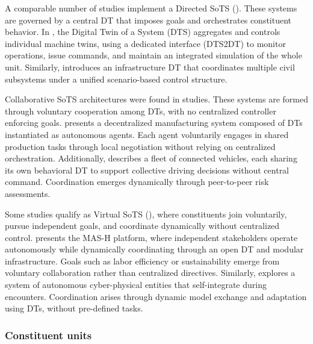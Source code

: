 A comparable number of studies implement a Directed SoTS  (). These systems are governed by a central DT that imposes goals and orchestrates constituent behavior. In \textcite{reiche2021digital}, the Digital Twin of a System (DTS) aggregates and controls individual machine twins, using a dedicated interface (DTS2DT) to monitor operations, issue commands, and maintain an integrated simulation of the whole unit. Similarly, \textcite{li2024comprehensive} introduces an infrastructure DT that coordinates multiple civil subsystems under a unified scenario-based control structure.

Collaborative SoTS architectures were found in  studies. These systems are formed through voluntary cooperation among DTs, with no centralized controller enforcing goals. \textcite{vogel-heuser2021approach} presents a decentralized manufacturing system composed of DTs instantiated as autonomous agents. Each agent voluntarily engages in shared production tasks through local negotiation without relying on centralized orchestration. Additionally, \textcite{chen2018digital} describes a fleet of connected vehicles, each sharing its own behavioral DT to support collective driving decisions without central command. Coordination emerges dynamically through peer-to-peer risk assessments.

Some studies qualify as Virtual SoTS (), where constituents join voluntarily, pursue independent goals, and coordinate dynamically without centralized control. \textcite{pickering2023towards} presents the MAS-H platform, where independent stakeholders operate autonomously while dynamically coordinating through an open DT and modular infrastructure. Goals such as labor efficiency or sustainability emerge from voluntary collaboration rather than centralized directives. Similarly, \textcite{esterle2021digital} explores a system of autonomous cyber-physical entities that self-integrate during encounters. Coordination arises through dynamic model exchange and adaptation using DTs, without pre-defined tasks.



\subsubsection{Constituent units}\label{sec:constituents}



